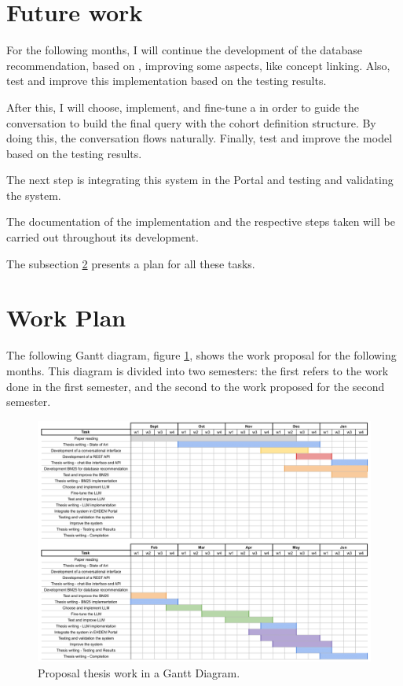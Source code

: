 \section{Future work}

For the following months, I will continue the development of the database recommendation, based on {\bm}, improving some aspects, like concept linking. Also, test and improve this {\ir} implementation based on the testing results. 

After this, I will choose, implement, and fine-tune a {\llm} in order to guide the conversation to build the final query with the cohort definition structure. By doing this, the conversation flows naturally. Finally, test and improve the model based on the testing results.

The next step is integrating this system in the {\ehden} Portal and testing and validating the system. 

The documentation of the implementation and the respective steps taken will be carried out throughout its development.

The subsection \ref{workplan} presents a plan for all these tasks.


\section{Work Plan}
\label{workplan}

The following Gantt diagram, figure \ref{fig_gantt}, shows the work proposal for the following months. This diagram is divided into two semesters: the first refers to the work done in the first semester, and the second to the work proposed for the second semester.

\begin{figure}[ht]
    \includegraphics[width=16cm]{figs/methodology/diagram_gantt.png}
    \centering
    \caption{Proposal thesis work in a Gantt Diagram.}
    \label{fig_gantt}
\end{figure}